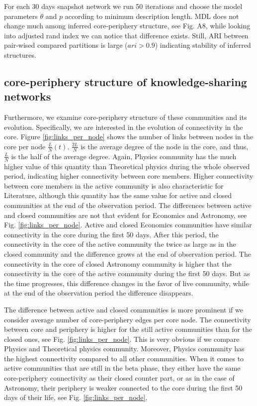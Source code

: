 For each 30 days snapshot network we run 50 iterations and choose the model parameters $\theta$ and $p$ according to minimum description length. MDL does not change much among inferred core-periphery structure, see Fig. A8, while looking into adjusted rand index we can notice that difference exists. Still, ARI between pair-wised compared partitions is large ($ari >0.9$) indicating stability of inferred structures.

\subsection{core-periphery structure of knowledge-sharing networks}

Furthermore, we examine core-periphery structure of these communities and its evolution. Specifically, we are interested in the evolution of connectivity in the core. Figure \ref{fig:links_per_node} shows the number of links between nodes in the core per node $\frac{L}{N}(t)$. $\frac{2L}{N}$ is the average degree of the node in the core, and thus, $\frac{L}{N}$ is the half of the average degree. Again, Physics community has the much higher value of this quantity than Theoretical physics during the whole observed period, indicating higher connectivity between core members. Higher connectivity between core members in the active community is also characteristic for Literature, although this quantity has the same value for active and closed communities at the end of the observation period. The differences between active and closed communities are not that evident for Economics and Astronomy, see Fig. \ref{fig:links_per_node}. Active and closed Economics communities have similar connectivity in the core during the first 50 days. After this period, the connectivity in the core of the active community the twice as large as in the closed community and the difference grows at the end of observation period. The connectivity in the core of closed Astronomy community is higher that the connectivity in the core of the active community during the first 50 days. But as the time progresses, this difference changes in the favor of live community, while at the end of the observation period the difference disappears.

The difference between active and closed communities is more prominent if we consider average number of core-periphery edges per core node. The connectivity between core and periphery is higher for the still active communities than for the closed ones, see Fig. \ref{fig:links_per_node}. This is very obvious if we compare Physics and Theoretical physics community. Moreover, Physics community has the highest connectivity compared to all other communities. When it comes to active communities that are still in the beta phase, they either have the same core-periphery connectivity as their closed counter part, or as in the case of Astronomy, their periphery is weaker connected to the core during the first 50 days of their life, see Fig. \ref{fig:links_per_node}. 

